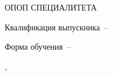 \vspace{0pt plus6fill} 
\begin{center}%
{\large ОПОП СПЕЦИАЛИТЕТА}\par
\MakeUppercase{\SpecialityOPOP}
\end{center}%

%
\vspace{0pt plus4fill} %
\begin{center}%
Квалификация выпускника~--~\Qualification\par
Форма обучения~--~\FormOfStudy
\end{center}%
%
\vspace{0pt plus4fill} 
\begin{center}%
{\MakeUppercase{\City},~\YearOfDocument}
\end{center}%
\newpage
